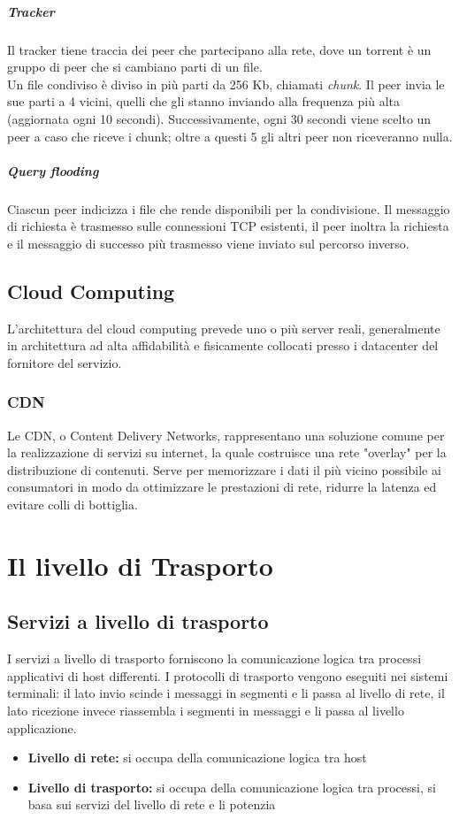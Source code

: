 \documentclass{report}
\begin{document}
	\paragraph{Tracker} Il tracker tiene traccia dei peer che partecipano alla rete, dove un torrent è un gruppo di peer che si cambiano parti di un file.
	\medskip\\Un file condiviso è diviso in più parti da 256 Kb, chiamati \textit{chunk}. Il peer invia le sue parti a 4 vicini, quelli che gli stanno inviando alla frequenza più alta (aggiornata ogni 10 secondi). Successivamente, ogni 30 secondi viene scelto un peer a caso che riceve i chunk; oltre a questi 5 gli altri peer non riceveranno nulla.
	\paragraph{Query flooding} Ciascun peer indicizza i file che rende disponibili per la condivisione. Il messaggio di richiesta è trasmesso sulle connessioni TCP esistenti, il peer inoltra la richiesta e il messaggio di successo più trasmesso viene inviato sul percorso inverso.
	\section{Cloud Computing}
	L'architettura del cloud computing prevede uno o più server reali, generalmente in architettura ad alta affidabilità e fisicamente collocati presso i datacenter del fornitore del servizio.
	\subsection{CDN}
	Le CDN, o Content Delivery Networks, rappresentano una soluzione comune per la realizzazione di servizi su internet, la quale costruisce una rete "overlay" per la distribuzione di contenuti. Serve per memorizzare i dati il più vicino possibile ai consumatori in modo da ottimizzare le prestazioni di rete, ridurre la latenza ed evitare colli di bottiglia.
	\chapter{Il livello di Trasporto}
	\section{Servizi a livello di trasporto}
	I servizi a livello di trasporto forniscono la comunicazione logica tra processi applicativi di host differenti. I protocolli di trasporto vengono eseguiti nei sistemi terminali: il lato invio scinde i messaggi in segmenti e li passa al livello di rete, il lato ricezione invece riassembla i segmenti in messaggi e li passa al livello applicazione.
	\begin{itemize}
		\item \textbf{Livello di rete:} si occupa della comunicazione logica tra host
		\item \textbf{Livello di trasporto:} si occupa della comunicazione logica tra processi, si basa sui servizi del livello di rete e li potenzia
	\end{itemize}
\end{document}
